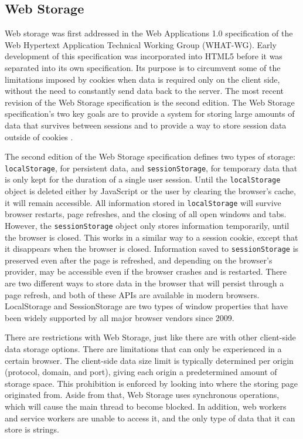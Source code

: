 \subsection*{Web Storage}
Web storage was first addressed in the Web Applications 1.0 specification of the Web Hypertext Application Technical Working Group (WHAT-WG). Early development of this specification was incorporated into HTML5 before it was separated into its own specification. Its purpose is to circumvent some of the limitations imposed by cookies when data is required only on the client side, without the need to constantly send data back to the server. The most recent revision of the Web Storage specification is the second edition. The Web Storage specification's two key goals are to provide a system for storing large amounts of data that survives between sessions and to provide a way to store session data outside of cookies \autocite{frisbie2019professional}.

The second edition of the Web Storage specification defines two types of storage: \texttt{localStorage}, for persistent data, and \texttt{sessionStorage}, for temporary data that is only kept for the duration of a single user session. Until the \texttt{localStorage} object is deleted either by JavaScript or the user by clearing the browser's cache, it will remain accessible. All information stored in \texttt{localStorage} will survive browser restarts, page refreshes, and the closing of all open windows and tabs. However, the \texttt{sessionStorage} object only stores information temporarily, until the browser is closed. This works in a similar way to a session cookie, except that it disappears when the browser is closed. Information saved to \texttt{sessionStorage} is preserved even after the page is refreshed, and depending on the browser's provider, may be accessible even if the browser crashes and is restarted. There are two different ways to store data in the browser that will persist through a page refresh, and both of these APIs are available in modern browsers. LocalStorage and SessionStorage are two types of window properties that have been widely supported by all major browser vendors since 2009.

There are restrictions with Web Storage, just like there are with other client-side data storage options. There are limitations that can only be experienced in a certain browser. The client-side data size limit is typically determined per origin (protocol, domain, and port), giving each origin a predetermined amount of storage space. This prohibition is enforced by looking into where the storing page originated from. Aside from that, Web Storage uses synchronous operations, which will cause the main thread to become blocked. In addition, web workers and service workers are unable to access it, and the only type of data that it can store is strings.

